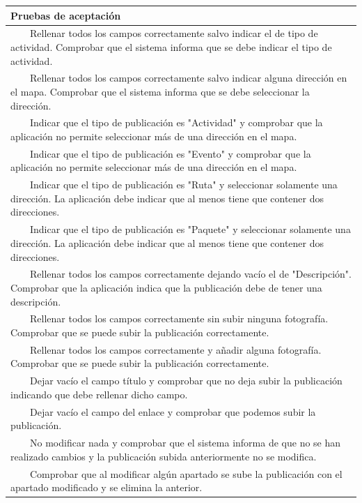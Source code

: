 \documentclass[11pt]{article}
\newcommand{\tabitem}{~~\llap{\textbullet}~~}
\begin{document}
\begin{longtable}{p{1.028\linewidth}}
  \textbf{Pruebas de aceptación}\\
  \midrule
  \tabitem Rellenar todos los campos correctamente salvo indicar el de tipo de actividad. Comprobar que el sistema informa que se debe indicar el tipo de actividad.\\
  \tabitem Rellenar todos los campos correctamente salvo indicar alguna dirección en el mapa. Comprobar que el sistema informa que se debe seleccionar la dirección.\\
  \tabitem Indicar que el tipo de publicación es "Actividad" y comprobar que la aplicación no permite seleccionar más de una dirección en el mapa.\\
  \tabitem Indicar que el tipo de publicación es "Evento" y comprobar que la aplicación no permite seleccionar más de una dirección en el mapa.\\
  \tabitem Indicar que el tipo de publicación es "Ruta" y seleccionar solamente una dirección. La aplicación debe indicar que al menos tiene que contener dos direcciones.\\
  \tabitem Indicar que el tipo de publicación es "Paquete" y seleccionar solamente una dirección. La aplicación debe indicar que al menos tiene que contener dos direcciones.\\
  \tabitem Rellenar todos los campos correctamente dejando vacío el de "Descripción". Comprobar que la aplicación indica que la publicación debe de tener una descripción.\\
  \tabitem Rellenar todos los campos correctamente sin subir ninguna fotografía. Comprobar que se puede subir la publicación correctamente.\\
  \tabitem Rellenar todos los campos correctamente y añadir alguna fotografía. Comprobar que se puede subir la publicación correctamente.\\
  \tabitem Dejar vacío el campo título y comprobar que no deja subir la publicación indicando que debe rellenar dicho campo.\\
  \tabitem Dejar vacío el campo del enlace y comprobar que podemos subir la publicación.\\
  \tabitem No modificar nada y comprobar que el sistema informa de que no se han realizado cambios y la publicación subida anteriormente no se modifica.\\
  \tabitem Comprobar que al modificar algún apartado se sube la publicación con el apartado modificado y se elimina la anterior.\\
\end{longtable}
\end{document}
